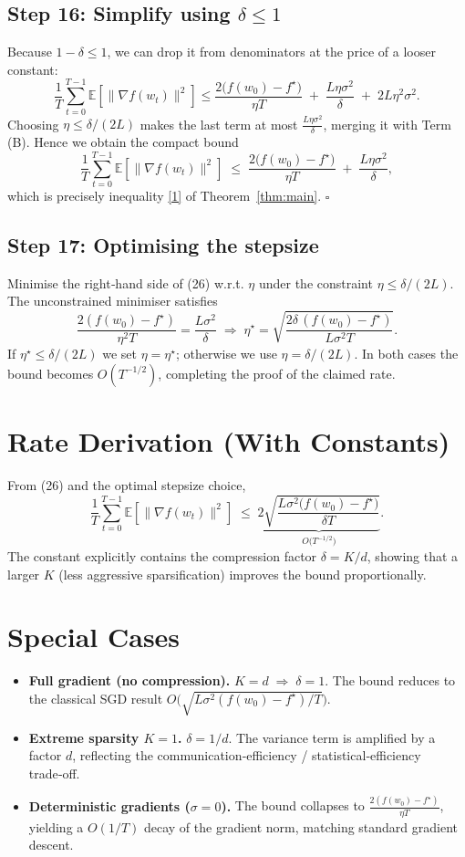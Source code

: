 \documentclass{article}
\newcommand{\E}{\mathbb{E}}
\begin{document}
\subsection*{Step 16: Simplify using $\delta\le1$}
Because $1-\delta\le1$, we can drop it from denominators at the price of a looser constant:
\[
\frac{1}{T}\sum_{t=0}^{T-1}\E[\|\nabla f(w_t)\|^2]
\le
\frac{2\big(f(w_0)-f^\star\big)}{\eta T}
\;+\;
\frac{L\eta\sigma^2}{\delta}
\;+\;
2L\eta^2\sigma^2 .
\tag{25}
\]
Choosing $\eta\le \delta/(2L)$ makes the last term at most $\frac{L\eta\sigma^2}{\delta}$, merging it with Term (B). Hence we obtain the compact bound
\[
\frac{1}{T}\sum_{t=0}^{T-1}\E[\|\nabla f(w_t)\|^2]
\;\le\;
\frac{2\big(f(w_0)-f^\star\big)}{\eta T}
\;+\;
\frac{L\eta\sigma^2}{\delta},
\tag{26}
\]
which is precisely inequality \eqref{1} of Theorem~\ref{thm:main}. \hfill $\square$

\subsection*{Step 17: Optimising the stepsize}
Minimise the right‑hand side of (26) w.r.t. $\eta$ under the constraint $\eta\le\delta/(2L)$.  
The unconstrained minimiser satisfies
\[
\frac{2(f(w_0)-f^\star)}{\eta^2 T}= \frac{L\sigma^2}{\delta}
\;\Longrightarrow\;
\eta^\star = \sqrt{\frac{2\delta\,(f(w_0)-f^\star)}{L\sigma^2 T}} .
\]
If $\eta^\star\le \delta/(2L)$ we set $\eta=\eta^\star$; otherwise we use $\eta=\delta/(2L)$.  In both cases the bound becomes $O(T^{-1/2})$, completing the proof of the claimed rate.

\section*{Rate Derivation (With Constants)}
From (26) and the optimal stepsize choice,
\[
\frac{1}{T}\sum_{t=0}^{T-1}\E[\|\nabla f(w_t)\|^2]
\;\le\;
\underbrace{2\sqrt{\frac{L\sigma^2\big(f(w_0)-f^\star\big)}{\delta T}}}_{\displaystyle O\!\big(T^{-1/2}\big)} .
\]
The constant explicitly contains the compression factor $\delta=K/d$, showing that a larger $K$ (less aggressive sparsification) improves the bound proportionally.

\section*{Special Cases}
\begin{itemize}
    \item \textbf{Full gradient (no compression).} $K=d\;\Rightarrow\;\delta=1$. The bound reduces to the classical SGD result $\displaystyle O\big(\sqrt{L\sigma^2(f(w_0)-f^\star)/T}\big)$.
    \item \textbf{Extreme sparsity $K=1$.} $\delta=1/d$. The variance term is amplified by a factor $d$, reflecting the communication‑efficiency / statistical‑efficiency trade‑off.
    \item \textbf{Deterministic gradients ($\sigma=0$).} The bound collapses to $\displaystyle \frac{2(f(w_0)-f^\star)}{\eta T}$, yielding a $O(1/T)$ decay of the gradient norm, matching standard gradient descent.
\end{itemize}
\end{document}
